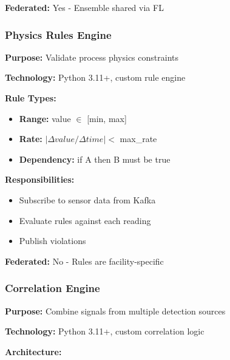 \documentclass[12pt,a4paper]{article}
\begin{document}
\textbf{Federated:} Yes - Ensemble shared via FL

\subsubsection{Physics Rules Engine}

\textbf{Purpose:} Validate process physics constraints

\textbf{Technology:} Python 3.11+, custom rule engine

\textbf{Rule Types:}
\begin{itemize}[leftmargin=1cm,itemsep=0pt]
    \item \textbf{Range:} value $\in$ [min, max]
    \item \textbf{Rate:} $|\Delta value / \Delta time| <$ max\_rate
    \item \textbf{Dependency:} if A then B must be true
\end{itemize}

\textbf{Responsibilities:}
\begin{itemize}[leftmargin=1cm,itemsep=0pt]
    \item Subscribe to sensor data from Kafka
    \item Evaluate rules against each reading
    \item Publish violations
\end{itemize}

\textbf{Federated:} No - Rules are facility-specific

\subsubsection{Correlation Engine}

\textbf{Purpose:} Combine signals from multiple detection sources

\textbf{Technology:} Python 3.11+, custom correlation logic

\textbf{Architecture:}
\end{document}
